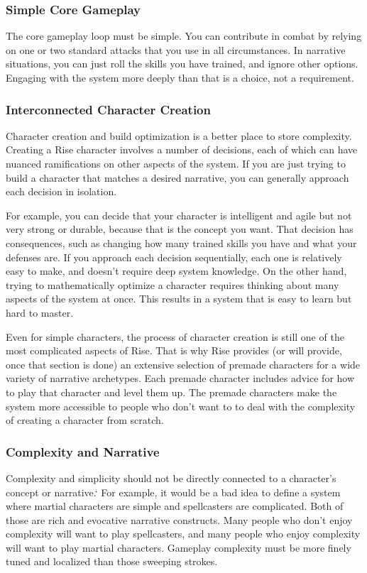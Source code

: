     \subsubsection{Simple Core Gameplay}
      The core gameplay loop must be simple.
      You can contribute in combat by relying on one or two standard attacks that you use in all circumstances.
      In narrative situations, you can just roll the skills you have trained, and ignore other options.
      Engaging with the system more deeply than that is a choice, not a requirement.

    \subsubsection{Interconnected Character Creation}
      Character creation and build optimization is a better place to store complexity.
      Creating a Rise character involves a number of decisions, each of which can have nuanced ramifications on other aspects of the system.
      If you are just trying to build a character that matches a desired narrative, you can generally approach each decision in isolation.

      For example, you can decide that your character is intelligent and agile but not very strong or durable, because that is the concept you want.
      That decision has consequences, such as changing how many trained skills you have and what your defenses are.
      If you approach each decision sequentially, each one is relatively easy to make, and doesn't require deep system knowledge.
      On the other hand, trying to mathematically optimize a character requires thinking about many aspects of the system at once.
      This results in a system that is easy to learn but hard to master.

      Even for simple characters, the process of character creation is still one of the most complicated aspects of Rise.
      That is why Rise provides (or will provide, once that section is done) an extensive selection of premade characters for a wide variety of narrative archetypes.
      Each premade character includes advice for how to play that character and level them up.
      The premade characters make the system more accessible to people who don't want to to deal with the complexity of creating a character from scratch.

    \subsubsection{Complexity and Narrative}
      Complexity and simplicity should not be directly connected to a character's concept or narrative.`
      For example, it would be a bad idea to define a system where martial characters are simple and spellcasters are complicated.
      Both of those are rich and evocative narrative constructs.
      Many people who don't enjoy complexity will want to play spellcasters, and many people who enjoy complexity will want to play martial characters.
      Gameplay complexity must be more finely tuned and localized than those sweeping strokes.

